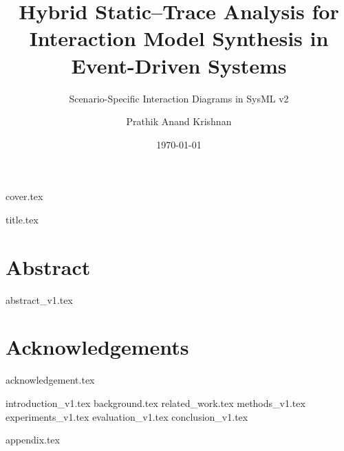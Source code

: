 \documentclass[oldfontcommands, oneside]{mscthesis}
\title{Hybrid Static--Trace Analysis for Interaction Model Synthesis in Event-Driven Systems}
\subtitle{Scenario-Specific Interaction Diagrams in SysML v2}
\date{\today}
\author{Prathik Anand Krishnan}
\begin{document}
%
%

\frontmatter
{cover.tex}

\cleartorecto{}
{title.tex}


\cleartorecto{}
\chapter{Abstract}
{abstract_v1.tex}
\glsresetall{}

\cleartorecto{}
\tableofcontents{}
\clearpage{}

\listoffigures{}
\clearpage{}

\listoftables{}
\clearpage{}

\cleartorecto{}
\chapter{Acknowledgements}
{acknowledgement.tex}


\mainmatter

{introduction_v1.tex}
{background.tex}
{related_work.tex}
{methods_v1.tex}
{experiments_v1.tex}
{evaluation_v1.tex}
{conclusion_v1.tex}

%
%

\appendix

{appendix.tex}

%
%

\backmatter

\printbibliography{}
\cleardoublepage{}

\printacronyms[style=list,title={Acronyms}]
\cleardoublepage{}

\end{document}
